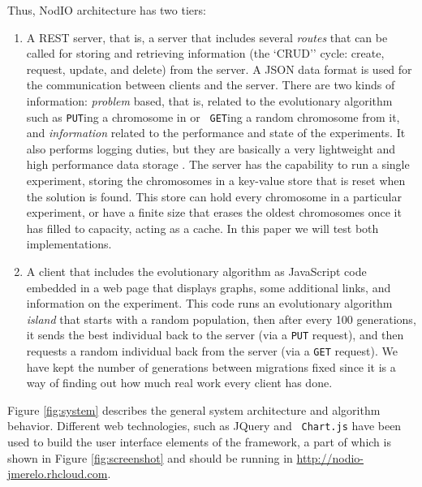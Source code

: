 \documentclass[letterpaper]{article}
\begin{document}
Thus, {\sf NodIO} architecture has two tiers:\begin{enumerate}
\item A REST server, that is, a server that includes several {\em
  routes} 
  that can be called for storing and retrieving information (the `CRUD'' cycle:
  create, request, update, and delete) from the server. 
  A JSON data format is used for the communication between 
  clients and the server. There are two kinds of information:
  {\em problem} based, that is, related to the
  evolutionary algorithm such as {\tt PUT}ing a chromosome in or {\tt
  GET}ing a random chromosome from it, and {\em information} related
  to the performance and state of the experiments. It also performs logging
  duties, but they are basically a very lightweight and high performance
  data storage \citep{jj:idc:lowcost}.
  The server has the capability to
  run a single experiment, storing the chromosomes in a key-value store
  that is reset when the solution is found. This store can
  hold every chromosome in a particular experiment, or have a finite
  size that erases the oldest chromosomes once it has filled to
  capacity, acting as a cache. In this paper we will test both implementations.  
\item A client that includes the evolutionary algorithm as
  JavaScript code embedded in a web page that displays graphs, some
  additional links, and information on the experiment. This code runs
  an evolutionary algorithm {\em island} that starts with a random
  population, then after every 100 generations, it sends the best individual
  back to the server (via a {\tt PUT} request), and then requests a random
  individual back from the server (via a {\tt GET} request). We have
  kept the number of generations between migrations fixed since it is
  a way of finding out how much real work every client has done. 
\end{enumerate}

Figure \ref{fig:system} describes the general system architecture and
algorithm behavior. Different web technologies, such as JQuery and {\tt
  Chart.js} have been used to build the user interface elements of the
framework, a part of which is shown in Figure \ref{fig:screenshot} and
should be running in \url{http://nodio-jmerelo.rhcloud.com}.
\end{document}
